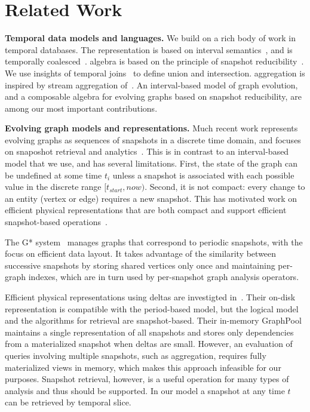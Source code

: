 \section{Related Work}
\label{sec:related}

{\bf Temporal data models and languages.} We build on a rich body of
work in temporal databases.  The \tg representation is based on
interval semantics~\cite{DBLP:reference/db/JensenS09k}, and is
temporally coalesced~\cite{DBLP:conf/vldb/BohlenSS96}.  \tg algebra is
based on the principle of snapshot
reducibility~\cite{DBLP:reference/db/Bohlen092}.  We use insights of
temporal joins~\cite{Gao2005} to define \tg union and intersection.
aggregation is inspired by stream aggregation of~\cite{Li2005}.  An
interval-based model of graph evolution, and a composable algebra for
evolving graphs based on snapshot reducibility, are among our most
important contributions.

{\bf Evolving graph models and representations.} Much recent work represents evolving graphs as sequences
of snapshots in a discrete time domain, and focuses on snaposhot
retrieval and
analytics~\cite{Khurana2013,DBLP:journals/tos/MiaoHLWYZPCC15,Ren2011}.
This is in contrast to an interval-based model that we use, and has
several limitations.  First, the state of the graph can be undefined
at some time $t_i$ unless a snapshot is associated with each possible
value in the discrete range $[t_{start}, now)$.  Second, it is not
  compact: every change to an entity (vertex or edge) requires a new
  snapshot.  This has motivated work on efficient
  physical representations that are both compact and support efficient
  snapshot-based
  operations~\cite{Khurana2013,DBLP:journals/tos/MiaoHLWYZPCC15,Ren2011}.

The G* system~\cite{Labouseur2015} manages graphs that correspond to
periodic snapshots, with the focus on efficient data layout.  It takes
advantage of the similarity between successive snapshots by storing
shared vertices only once and maintaining per-graph indexes, which are
in turn used by per-snapshot graph analysis operators.  

Efficient physical representations using deltas are investigted
in~\cite{Khurana2013}.  Their on-disk representation is compatible
with the period-based model, but the logical model and the algorithms
for retrieval are snapshot-based.  Their in-memory GraphPool maintains
a single representation of all snapshots and stores only dependencies
from a materialized snapshot when deltas are small.  However, an
evaluation of queries involving multiple snapshots, such as
aggregation, requires fully materialized views in memory, which makes
this approach infeasible for our purposes.  Snapshot retrieval,
however, is a useful operation for many types of analysis and thus
should be supported.  In our model a snapshot at any time $t$ can be
retrieved by temporal slice.

